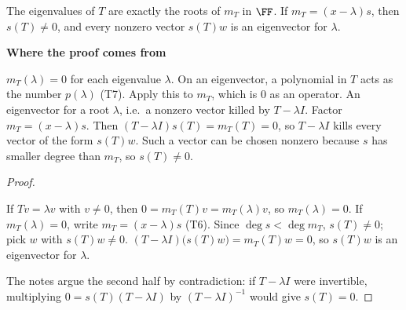 \documentclass[10pt]{scrartcl}
\newenvironment{motive}{\begin{mdframed}[style=thinkbox]\textbf{\color{OliveGreen!75!black}Where the proof comes from}\begin{description}[leftmargin=0.9em,labelindent=0pt,itemsep=2pt,topsep=2pt,font=\normalfont\bfseries\color{OliveGreen!70!black}]}{\end{description}\end{mdframed}}
\newenvironment{steps}{\begin{enumerate}[label=\arabic*.,leftmargin=1.5em,itemsep=2pt,topsep=2pt]}{\end{enumerate}}
\begin{document}
\begin{proposition*}
  The eigenvalues of $T$ are exactly the roots of $m_T$ in $\FF$. If $m_T=(x-\lambda)s$, then $s(T)\ne0$, and every nonzero vector $s(T)w$ is an eigenvector for $\lambda$.
\end{proposition*}
\begin{motive}
   $m_T(\lambda)=0$ for each eigenvalue $\lambda$.
  \ii[Know.] On an eigenvector, a polynomial in $T$ acts as the number $p(\lambda)$ (T7). Apply this to $m_T$, which is $0$ as an operator.
   An eigenvector for a root $\lambda$, i.e.\ a nonzero vector killed by $T-\lambda I$.
   Factor $m_T=(x-\lambda)s$. Then $(T-\lambda I)s(T)=m_T(T)=0$, so $T-\lambda I$ kills every vector of the form $s(T)w$. Such a vector can be chosen nonzero because $s$ has smaller degree than $m_T$, so $s(T)\ne0$.
\end{motive}
\begin{proof}
  \begin{steps}
    \ii If $Tv=\lambda v$ with $v\ne0$, then $0=m_T(T)v=m_T(\lambda)v$, so $m_T(\lambda)=0$.
    \ii If $m_T(\lambda)=0$, write $m_T=(x-\lambda)s$ (T6). Since $\deg s<\deg m_T$, $s(T)\ne0$; pick $w$ with $s(T)w\ne0$.
    \ii $(T-\lambda I)\bigl(s(T)w\bigr)=m_T(T)w=0$, so $s(T)w$ is an eigenvector for $\lambda$.
  \end{steps}
  The notes argue the second half by contradiction: if $T-\lambda I$ were invertible, multiplying $0=s(T)(T-\lambda I)$ by $(T-\lambda I)^{-1}$ would give $s(T)=0$.
\end{proof}
\end{document}
